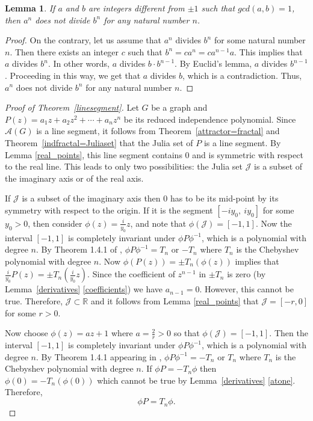 \documentclass[12pt,a4paper]{article}
\theoremstyle{plain}
\newtheorem{lemma}{Lemma}
\numberwithin{equation}{section}
\begin{document}
  
  \begin{lemma}
  	If $a$ and $b$ are integers different from $\pm 1$ such that $gcd (a, b) = 1$, then $a^n$ does not divide $b^n$ for any natural number $n$.
  	\label{division}
  \end{lemma}
  \begin{proof}
  	On the contrary, let us assume that $a^n$ divides $b^n$ for some natural number $n$. Then there exists an integer \(c \) such that \(b^n = c a^n = c a^{n-1}a\). This implies that \(a\) divides \(b^n \). In other words, \(a\) divides \( b\cdot b^{n-1}\). By Euclid's lemma, \(a\) divides \(b^{n-1}\). Proceeding in this way, we get that \(a\) divides \(b\), which is a contradiction. Thus, $a^n$ does not divide $b^n$ for any natural number $n$.
  \end{proof}
  \begin{proof}[Proof of Theorem~\ref{linesegment}]
  	Let $G$ be a graph and $P(z)=a_1 z +a_2 z^2+\cdots +a_n z^n$ be its reduced independence polynomial. Since $\mathcal{A}(G)$ is a line segment, it follows from Theorem~\ref{attractor=fractal} and Theorem~\ref{indfractal=Juliaset} that the Julia set of $P$ is a line segment. By Lemma \ref{real_points}, this line segment contains $0$ and is symmetric with respect to the real line. This leads to only two possibilities:  the Julia set $\mathcal{J}$ is a subset  of the imaginary axis or of the real axis.
  	
  	\par 
  	If  $\mathcal{J}$ is a subset of the imaginary axis then $0$ has to be its mid-point by its symmetry with respect to the origin. If it is the segment $[-i y_0,~ i y_0]$ for some $y_0 >0$, then consider $\phi(z) = \frac{i}{y_0}z$, and note that $\phi(\mathcal{J})=[-1,1]$.  Now the interval  $[-1,1]$ is completely invariant under $\phi P\phi^{-1}$, which is a polynomial with degree $n$. By Theorem 1.4.1 of \cite{beardon}, $\phi P\phi^{-1}=T_n$ or $-T_n$ where $T_n $ is the  Chebyshev polynomial with degree $n$. Now $\phi (P(z))=\pm T_n(\phi(z))$ implies that $\frac{i}{y_0}P(z)=\pm T_n(\frac{i}{y_{0}}z)$. Since the coefficient of $z^{n-1}$ in $\pm T_n$ is zero (by Lemma~\ref{derivatives} \ref{coefficients}) we have $a_{n-1} =0$. However, this cannot be true. Therefore, $\mathcal{J} \subset \mathbb{R}$ and it follows from Lemma \ref{real_points} that $\mathcal{J}= [-r,0]$ for some $r>0$.	 
  	
  	\par 
  	Now choose $\phi(z)=az+1$ where $a=\frac{2}{r}>0$ so that $\phi(\mathcal{J}) =[-1,1]$. Then the interval  $[-1,1]$ is completely invariant under $\phi P\phi^{-1}$, which is a polynomial with degree $n$. By Theorem 1.4.1  appearing in \cite{beardon}, $\phi P\phi^{-1}=-T_n$ or $T_n$ where $T_n $ is the Chebyshev polynomial with degree $n$.
  	If $\phi P =-T_n \phi$ then $ \phi(0)=-T_n(\phi(0))$ which cannot be true by Lemma~\ref{derivatives} \ref{atone}. Therefore, 
  	\begin{equation}
  		\phi P =T_n \phi.
  		\label{conju}
  	\end{equation}   
  	

\end{proof}
\end{document}
